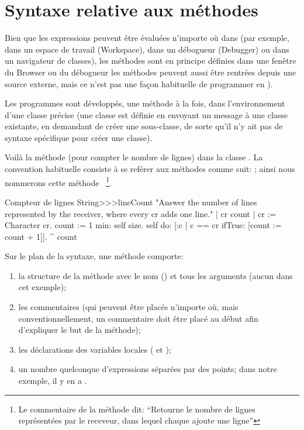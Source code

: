 \documentclass[a4paper,10pt,twoside]{book}
\begin{document}
\section{Syntaxe relative aux méthodes}
Bien que les expressions peuvent être évaluées n'importe
où dans \pharo (par exemple, dans un espace de travail (Workspace),
dans un débogueur (Debugger) ou dans un navigateur de classes), 
les méthodes sont en principe définies dans une fenêtre du
Browser ou du débogueur
les méthodes peuvent aussi être rentrées %
depuis une source externe, mais ce n'est pas une façon habituelle de programmer en \pharo).

Les programmes sont développés, une méthode à la fois,
dans l'environnement d'une classe précise (une classe est définie en envoyant 
un message à une classe existante, en demandant de créer une sous-classe, de sorte 
qu'il n'y ait pas de syntaxe spécifique pour créer une classe).

Voilà la méthode  (pour compter le
nombre de lignes) dans la classe  .
La convention habituelle consiste à se reférer aux méthodes
comme suit: ; ainsi nous nommerons cette
méthode ~\footnote{Le commentaire de la
  méthode dit: 
``Retourne le nombre de lignes représentées par le receveur, dans
    lequel chaque  ajoute une ligne''}.

\begin{method}[lineCount]{Compteur de lignes}
String>>>lineCount
   "Answer the number of lines represented by the receiver,
   where every cr adds one line."
   | cr count |
   cr := Character cr.
   count := 1  min: self size.
   self do:
      [:c | c == cr ifTrue: [count := count + 1]].
   ^ count
\end{method}

Sur le plan de la syntaxe, une méthode comporte:
\begin{enumerate}
  \item la structure de la méthode avec le nom (\ie {}) et tous les arguments (aucun dans cet exemple);
  \item les commentaires (qui peuvent être placés n'importe
    où, mais conventionnellement, un commentaire doit être placé au début afin d'expliquer le but de la méthode);
  \item les déclarations des variables locales (\ie {} et
    ); 
  \item un nombre quelconque d'expressions séparées par des points; dans notre exemple, il y en a .
\end{enumerate}
\end{document}
